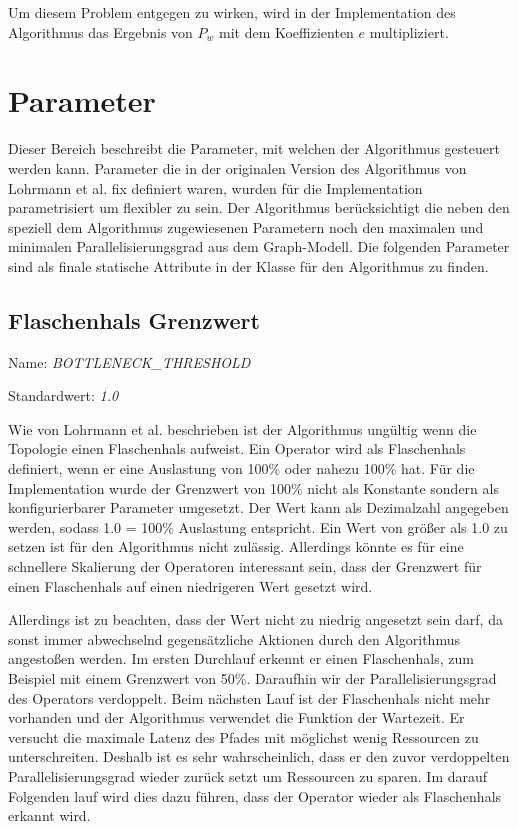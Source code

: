 Um diesem Problem entgegen zu wirken, wird in der Implementation des Algorithmus das Ergebnis von \(P_w\) mit dem Koeffizienten \(e\) multipliziert.

\section{Parameter}

Dieser Bereich beschreibt die Parameter, mit welchen der Algorithmus gesteuert werden kann.
Parameter die in der originalen Version des Algorithmus von Lohrmann et al. fix definiert waren, wurden für die Implementation parametrisiert um flexibler zu sein.
Der Algorithmus berücksichtigt die neben den speziell dem Algorithmus zugewiesenen Parametern noch den maximalen und minimalen Parallelisierungsgrad aus dem Graph-Modell.
Die folgenden Parameter sind als finale statische Attribute in der Klasse für den Algorithmus zu finden.

\subsection{Flaschenhals Grenzwert}

Name: \textit{BOTTLENECK\_THRESHOLD}

Standardwert: \textit{1.0}

Wie von Lohrmann et al. beschrieben ist der Algorithmus ungültig wenn die Topologie einen Flaschenhals aufweist.
Ein Operator wird als Flaschenhals definiert, wenn er eine Auslastung von 100\% oder nahezu 100\% hat.
Für die Implementation wurde der Grenzwert von 100\% nicht als Konstante sondern als konfigurierbarer Parameter umgesetzt.
Der Wert kann als Dezimalzahl angegeben werden, sodass 1.0 = 100\% Auslastung entspricht.
Ein Wert von größer als 1.0 zu setzen ist für den Algorithmus nicht zulässig.
Allerdings könnte es für eine schnellere Skalierung der Operatoren interessant sein, dass der Grenzwert für einen Flaschenhals auf einen niedrigeren Wert gesetzt wird.

Allerdings ist zu beachten, dass der Wert nicht zu niedrig angesetzt sein darf, da sonst immer abwechselnd gegensätzliche Aktionen durch den Algorithmus angestoßen werden.
Im ersten Durchlauf erkennt er einen Flaschenhals, zum Beispiel mit einem Grenzwert von 50\%.
Daraufhin wir der Parallelisierungsgrad des Operators verdoppelt.
Beim nächsten Lauf ist der Flaschenhals nicht mehr vorhanden und der Algorithmus verwendet die Funktion der Wartezeit.
Er versucht die maximale Latenz des Pfades mit möglichst wenig Ressourcen zu unterschreiten.
Deshalb ist es sehr wahrscheinlich, dass er den zuvor verdoppelten Parallelisierungsgrad wieder zurück setzt um Ressourcen zu sparen.
Im darauf Folgenden lauf wird dies dazu führen, dass der Operator wieder als Flaschenhals erkannt wird.

